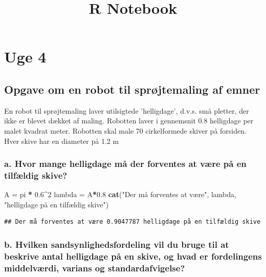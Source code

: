 \documentclass[
]{article}
\title{R Notebook}
\author{}
\date{\vspace{-2.5em}}
\newenvironment{Shaded}{\begin{snugshade}}{\end{snugshade}}
\newcommand{\DecValTok}[1]{\textcolor[rgb]{0.00,0.00,0.81}{#1}}
\newcommand{\FloatTok}[1]{\textcolor[rgb]{0.00,0.00,0.81}{#1}}
\newcommand{\FunctionTok}[1]{\textcolor[rgb]{0.13,0.29,0.53}{\textbf{#1}}}
\newcommand{\NormalTok}[1]{#1}
\newcommand{\OtherTok}[1]{\textcolor[rgb]{0.56,0.35,0.01}{#1}}
\newcommand{\SpecialCharTok}[1]{\textcolor[rgb]{0.81,0.36,0.00}{\textbf{#1}}}
\newcommand{\StringTok}[1]{\textcolor[rgb]{0.31,0.60,0.02}{#1}}
\begin{document}
\maketitle

\section{Uge 4}\label{uge-4}

\subsection{\texorpdfstring{\textbf{Opgave} om en robot til
sprøjtemaling af
emner}{Opgave om en robot til sprøjtemaling af emner}}\label{opgave-om-en-robot-til-spruxf8jtemaling-af-emner}

En robot til sprøjtemaling laver utilsigtede 'helligdage', d.v.s. små
pletter, der ikke er blevet dækket af maling. Robotten laver i
gennemsnit 0.8 helligdage per malet kvadrat meter. Robotten skal male 70
cirkelformede skiver på forsiden. Hver skive har en diameter på 1.2 m

\subsubsection{a. Hvor mange helligdage må der forventes at være på en
tilfældig
skive?}\label{a.-hvor-mange-helligdage-muxe5-der-forventes-at-vuxe6re-puxe5-en-tilfuxe6ldig-skive}

\begin{Shaded}
\begin{Highlighting}[]
\NormalTok{A }\OtherTok{=}\NormalTok{ pi }\SpecialCharTok{*} \FloatTok{0.6}\SpecialCharTok{\^{}}\DecValTok{2}
\NormalTok{lambda }\OtherTok{=}\NormalTok{ A}\SpecialCharTok{*}\FloatTok{0.8}
\FunctionTok{cat}\NormalTok{(}\StringTok{"Der må forventes at være"}\NormalTok{, lambda, }\StringTok{"helligdage på en tilfældig skive"}\NormalTok{)}
\end{Highlighting}
\end{Shaded}

\begin{verbatim}
## Der må forventes at være 0.9047787 helligdage på en tilfældig skive
\end{verbatim}

\subsubsection{b. Hvilken sandsynlighedsfordeling vil du bruge til at
beskrive antal helligdage på en skive, og hvad er fordelingens
middelværdi, varians og
standardafvigelse?}\label{b.-hvilken-sandsynlighedsfordeling-vil-du-bruge-til-at-beskrive-antal-helligdage-puxe5-en-skive-og-hvad-er-fordelingens-middelvuxe6rdi-varians-og-standardafvigelse}
\end{document}
